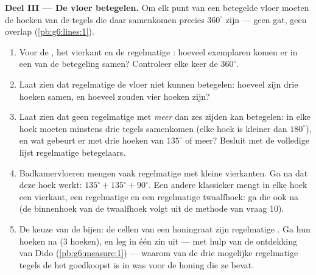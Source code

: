 \begin{problem}
\medskip
\noindent\textbf{Deel III --- De vloer betegelen.}
Om elk punt van een betegelde vloer moeten de hoeken van de tegels die daar
samenkomen precies $360^\circ$ zijn --- geen gat, geen overlap
(\cref{pb:g6:lines:1}).
\begin{enumerate}[resume]
  \item Voor de , het vierkant en de regelmatige :
        hoeveel exemplaren komen er in een  van de betegeling samen?
        Controleer elke keer de $360^\circ$.
  \item Laat zien dat regelmatige  de vloer niet kunnen betegelen: hoeveel
        zijn drie hoeken samen, en hoeveel zouden vier hoeken zijn?
  \item Laat zien dat geen regelmatige  met \emph{meer} dan zes zijden kan
        betegelen: in elke hoek moeten minstens drie tegels samenkomen (elke hoek is
        kleiner dan $180^\circ$), en wat gebeurt er met drie hoeken van $135^\circ$
        of meer? Besluit met de volledige lijst regelmatige betegelaars.
  \item Badkamervloeren mengen vaak regelmatige  met kleine vierkanten. Ga
        na dat deze hoek werkt: $135^\circ + 135^\circ + 90^\circ$. Een andere
        klassieker mengt in elke hoek een vierkant, een regelmatige  en een
        regelmatige twaalfhoek: ga die ook na (de binnenhoek van de twaalfhoek volgt
        uit de methode van vraag 10).
  \item De keuze van de bijen: de cellen van een honingraat zijn regelmatige
        . Ga hun hoeken na ($3$ hoeken), en leg in één zin uit --- met hulp
        van de ontdekking van Dido (\cref{pb:g6:measure:1}) --- waarom van de drie
        mogelijke regelmatige tegels de  het goedkoopst is in was voor de
        honing die ze bevat.
\end{enumerate}
\end{problem}
